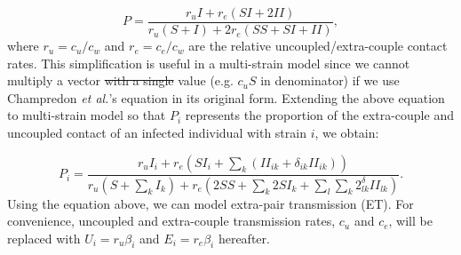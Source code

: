 \documentclass[10pt,letterpaper]{article}
\newcommand{\etal}{\textit{et al.}}
\providecommand{\DIFaddtex}[1]{{\protect\color{blue}\uwave{#1}}} %
\providecommand{\DIFdeltex}[1]{{\protect\color{red}\sout{#1}}}                      %
\providecommand{\DIFaddbegin}{} %
\providecommand{\DIFaddend}{} %
\providecommand{\DIFdelbegin}{} %
\providecommand{\DIFdelend}{} %
\providecommand{\DIFadd}[1]{\texorpdfstring{\DIFaddtex{#1}}{#1}} %
\providecommand{\DIFdel}[1]{\texorpdfstring{\DIFdeltex{#1}}{}} %
\newcommand{\DIFscaledelfig}{0.5}
\newlength{\DIFdelgraphicswidth} %
\newlength{\DIFdelgraphicsheight} %
\newcommand{\DIFaddincludegraphics}[2][]{{\color{blue}\fbox{\DIFOincludegraphics[#1]{#2}}}} %
\newcommand{\DIFdelincludegraphics}[2][]{%
\sbox{\DIFdelgraphicsbox}{\DIFOincludegraphics[#1]{#2}}%
\settoboxwidth{\DIFdelgraphicswidth}{\DIFdelgraphicsbox} %
\settoboxtotalheight{\DIFdelgraphicsheight}{\DIFdelgraphicsbox} %
\scalebox{\DIFscaledelfig}{%
\parbox[b]{\DIFdelgraphicswidth}{\usebox{\DIFdelgraphicsbox}\\[-\baselineskip] \rule{\DIFdelgraphicswidth}{0em}}\llap{\resizebox{\DIFdelgraphicswidth}{\DIFdelgraphicsheight}{%
\setlength{\unitlength}{\DIFdelgraphicswidth}%
\begin{picture}(1,1)%
\thicklines\linethickness{2pt} %
{\color[rgb]{1,0,0}\put(0,0){\framebox(1,1){}}}%
{\color[rgb]{1,0,0}\put(0,0){\line( 1,1){1}}}%
{\color[rgb]{1,0,0}\put(0,1){\line(1,-1){1}}}%
\end{picture}%
}\hspace*{3pt}}} %
} %
\DeclareRobustCommand{\DIFaddbegin}{\DIFOaddbegin \let\includegraphics\DIFaddincludegraphics} %
\DeclareRobustCommand{\DIFaddend}{\DIFOaddend \let\includegraphics\DIFOincludegraphics} %
\DeclareRobustCommand{\DIFdelbegin}{\DIFOdelbegin \let\includegraphics\DIFdelincludegraphics} %
\DeclareRobustCommand{\DIFdelend}{\DIFOaddend \let\includegraphics\DIFOincludegraphics} %
\begin{document}
\begin{equation}
P = \frac{r_u I + r_e (SI + 2 II)}{r_u (S + I) + 2 r_e(SS + SI + II)},
\end{equation}
where $r_u = c_u/c_w$ and $r_e = c_e/c_w$ are the relative uncoupled/extra-couple contact rates. This simplification is useful in a multi-strain model since we cannot multiply a vector \DIFdelbegin \DIFdel{with a single }\DIFdelend \DIFaddbegin \DIFadd{by a scalar }\DIFaddend value (e.g. $c_u S$ in denominator) if we use Champredon \etal's equation in its original form. Extending the above equation to \DIFaddbegin \DIFadd{the }\DIFaddend multi-strain model so that $P_i$ represents the proportion of the extra-couple and uncoupled contact of an infected individual with strain $i$, we obtain:

\begin{equation}
P_i = \frac{r_u I_i + r_e (SI_i + \sum_k (II_{ik} + \delta_{ik} II_{ik}))}{r_u (S + \sum_k I_k) + r_e(2 SS + \sum_k 2 SI_k + \sum_l \sum_k 2^\delta_{lk} II_{lk} )}.
\end{equation}
Using the equation above, we can model extra-pair transmission (ET). For convenience, uncoupled and extra-couple transmission rates, $c_u$ and $c_e$, will be replaced with $U_i = r_u \beta_i$ and $E_i = r_e \beta_i$ hereafter.
\end{document}
